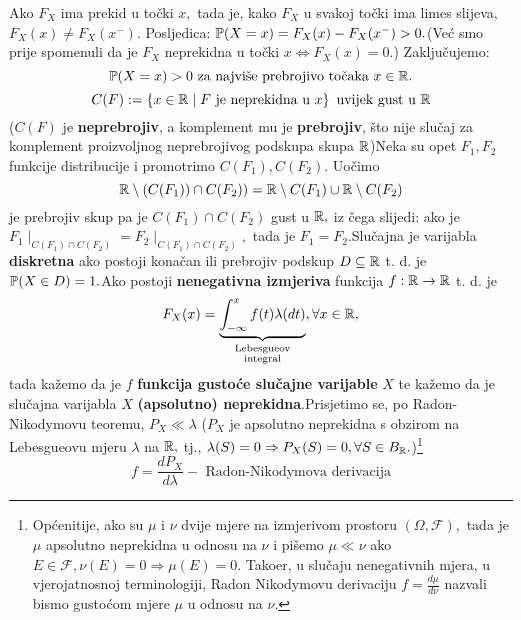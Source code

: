 \documentclass{article}
\begin{document}
Ako \(F_X\) ima prekid u točki \(x,\) tada je, kako \(F_X\) u svakoj točki ima limes slijeva, \(F_X(x)\ne F_X(x^-).\) Posljedica: \(\Bbb P(X=x)=F_X(x)-F_X(x^-)>0.\)\newline (Već smo prije spomenuli da je \(F_X\) neprekidna u točki \(x\Leftrightarrow F_X(x)=0.\)) Zaključujemo: \[\Bbb P(X=x)>0\text{ za najviše prebrojivo točaka }x\in\Bbb R.\] \[C(F):=\left\{x\in\Bbb R\mid F\text{ je neprekidna u }x\right\}\text{ uvijek gust u }\Bbb R\] (\(C(F)\) je \textbf{neprebrojiv}, a komplement mu je \textbf{prebrojiv}, što nije slučaj za komplement proizvoljnog neprebrojivog podskupa skupa \(\Bbb R\))\newline\newline Neka su opet \(F_1,F_2\) funkcije distribucije i promotrimo \(C(F_1),C(F_2).\) Uočimo \[\Bbb R\setminus(C(F_1))\cap C(F_2))=\Bbb R\setminus C(F_1)\cup\Bbb R\setminus C(F_2)\] je prebrojiv skup pa je \(C(F_1)\cap C(F_2)\) gust u \(\Bbb R,\) iz čega slijedi: ako je \(F_1\mid_{C(F_1)\cap C(F_2)}=F_2\mid_{C(F_1)\cap C(F_2)},\) tada je \(F_1=F_2.\)\newline\newline Slučajna je varijabla \textbf{diskretna} ako postoji konačan ili prebrojiv podskup \(D\subseteq\Bbb R\) t. d. je \(\Bbb P(X\in D)=1.\)\newline\newline Ako postoji \textbf{nenegativna izmjeriva} funkcija \(f:\Bbb R\to\Bbb R\) t. d. je  \[F_X(x)=\underbrace{\int_{-\infty}^xf(t)\lambda(dt)}_{\substack{\text{Lebesgueov}\\\text{integral}}},\forall x\in\Bbb R,\] tada kažemo da je \(f\) \textbf{funkcija gustoće slučajne varijable} \(X\) te kažemo da je slučajna varijabla \(X\) \textbf{(apsolutno) neprekidna}.\newline Prisjetimo se, po Radon-Nikodymovu teoremu, \(\boxed{P_X\ll\lambda}\) (\(P_X\) je apsolutno neprekidna s obzirom na Lebesgueovu mjeru \(\lambda\) na \(\Bbb R,\) tj., \(\lambda(S)=0\Rightarrow P_X(S)=0,\forall S\in B_{\Bbb R}.\))\footnote[1]{Općenitije, ako su \(\mu\) i \(\nu\) dvije mjere na izmjerivom prostoru \((\Omega,\mathcal F),\) tada je \(\mu\) apsolutno neprekidna u odnosu na \(\nu\) i pišemo \(\mu\ll\nu\) ako \(E\in\mathcal F,\nu(E)=0\Rightarrow\mu(E)=0.\) Tako\dj{}er, u slučaju nenegativnih mjera, u vjerojatnosnoj terminologiji, Radon Nikodymovu derivaciju \(f=\frac{d\mu}{d\nu}\) nazvali bismo gustoćom mjere \(\mu\) u odnosu na \(\nu.\)} \[f=\frac{dP_X}{d\lambda}-\text{ Radon-Nikodymova derivacija}\]\newline\newline
\end{document}
